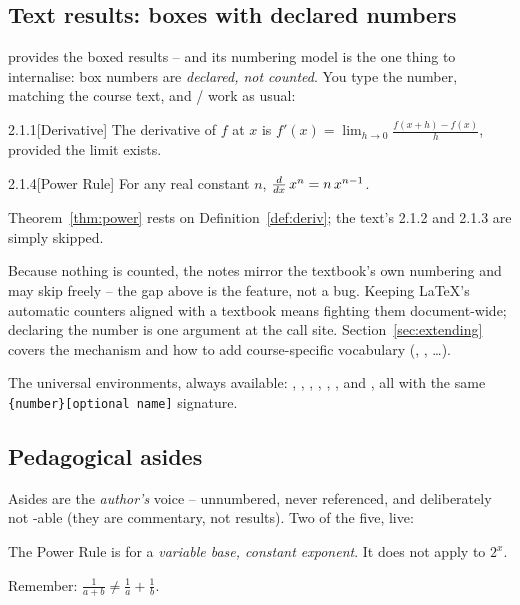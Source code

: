 \subsection{Text results: boxes with declared numbers}

 provides the boxed results -- and its numbering model is
the one thing to internalise: box numbers are \emph{declared, not counted}.
You type the number, matching the course text, and / work as
usual:

\begin{manexample}
\begin{definition}{2.1.1}[Derivative]\label{def:deriv}
  The derivative of $f$ at $x$ is
  $f'(x) = \lim_{h \to 0} \frac{f(x+h) - f(x)}{h}$,
  provided the limit exists.
\end{definition}

\begin{theorem}{2.1.4}[Power Rule]\label{thm:power}
  For any real constant $n$, $\frac{d}{dx}\,x^{n} = n\,x^{n-1}$.
\end{theorem}

Theorem~\ref{thm:power} rests on Definition~\ref{def:deriv}; the
text's 2.1.2 and 2.1.3 are simply skipped.
\end{manexample}

Because nothing is counted, the notes mirror the textbook's own numbering and
may skip freely -- the gap above is the feature, not a bug. Keeping LaTeX's
automatic counters aligned with a textbook means fighting them document-wide;
declaring the number is one argument at the call site.
Section~\ref{sec:extending} covers the mechanism and how to add
course-specific vocabulary (, , \dots).

The universal environments, always available: ,
, , , ,
, and , all with the same
\texttt{\{number\}[optional name]} signature.

\subsection{Pedagogical asides}

Asides are the \emph{author's} voice -- unnumbered, never referenced, and
deliberately not -able (they are commentary, not results). Two of
the five, live:

\begin{manexample}
\begin{caution}
  The Power Rule is for a \emph{variable base, constant
  exponent}. It does not apply to $2^{x}$.
\end{caution}

\begin{tip}[surviving]
  Remember: $\frac{1}{a+b} \neq \frac{1}{a} + \frac{1}{b}$.
\end{tip}
\end{manexample}


